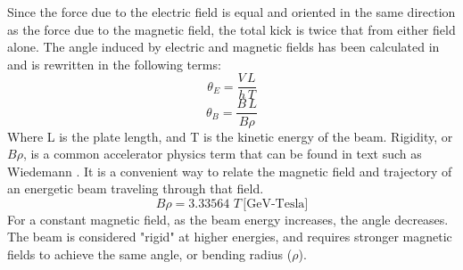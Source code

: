 Since the force due to the electric field is equal and oriented in the same direction as the force due to the magnetic field, 
the total kick is twice that from either field alone.  
The angle induced by electric and magnetic fields has been calculated in \cite{iukicker, Wiedemann}
and is rewritten in the following terms:  
\begin{equation}
\theta_E= \frac{V\,L}{h\,T}
\end{equation}
\begin{equation}
\theta_B= \frac{B\,L}{B\rho}
\end{equation}
Where L is the plate length, and T is the kinetic energy of the beam. 
Rigidity, or $B\rho$, is a common accelerator physics term that can be found in text such as Wiedemann \cite{Wiedemann}. 
It is a convenient way to relate the magnetic field and trajectory of an energetic beam traveling through that field.
\begin{equation}
	B\rho=3.33564\,\,T\, \text{[GeV-Tesla]}
\end{equation} 
For a constant magnetic field, as the beam energy increases, the angle decreases. 
The beam is considered "rigid" at higher energies, 
and requires stronger magnetic fields to achieve the same angle, or bending radius ($\rho$).

